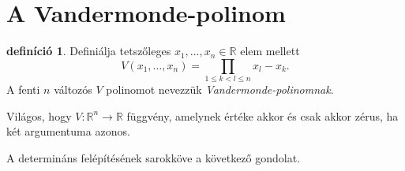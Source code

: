 \documentclass[a4paper, showtrims]{memoir}
\theoremstyle{plain}
\theoremstyle{remark}
\theoremstyle{definition}
\newtheorem{definition}[proposition]{definíció}
\begin{document}
\section{A Vandermonde-polinom}
    
\begin{definition}
    Definiálja tetszőleges $x_1,\ldots,x_n\in\mathbb{R}$ elem mellett
    \[
       V\left( x_1,\ldots,x_n \right)=
       \prod_{1\leq k<l\leq n}x_l-x_k.
    \]
    A fenti $n$ változós $V$ polinomot nevezzük \emph{Vandermonde-polinomnak}.
\end{definition}

Világos, hogy $V:\mathbb{R}^n\to\mathbb{R}$ függvény, amelynek értéke akkor és csak akkor zérus,
ha két argumentuma azonos.

A determináns felépítésének sarokköve a következő gondolat.
\end{document}
